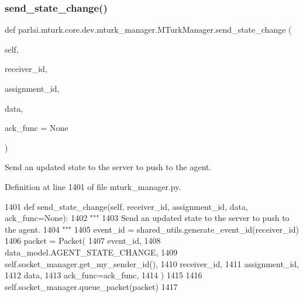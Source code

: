 \subsubsection{\texorpdfstring{send\+\_\+state\+\_\+change()}{send\_state\_change()}}
{\footnotesize\ttfamily def parlai.\+mturk.\+core.\+dev.\+mturk\+\_\+manager.\+M\+Turk\+Manager.\+send\+\_\+state\+\_\+change (\begin{DoxyParamCaption}\item[{}]{self,  }\item[{}]{receiver\+\_\+id,  }\item[{}]{assignment\+\_\+id,  }\item[{}]{data,  }\item[{}]{ack\+\_\+func = {\ttfamily None} }\end{DoxyParamCaption})}

\begin{DoxyVerb}Send an updated state to the server to push to the agent.
\end{DoxyVerb}
 

Definition at line 1401 of file mturk\+\_\+manager.\+py.


\begin{DoxyCode}
1401     \textcolor{keyword}{def }send\_state\_change(self, receiver\_id, assignment\_id, data, ack\_func=None):
1402         \textcolor{stringliteral}{"""}
1403 \textcolor{stringliteral}{        Send an updated state to the server to push to the agent.}
1404 \textcolor{stringliteral}{        """}
1405         event\_id = shared\_utils.generate\_event\_id(receiver\_id)
1406         packet = Packet(
1407             event\_id,
1408             data\_model.AGENT\_STATE\_CHANGE,
1409             self.socket\_manager.get\_my\_sender\_id(),
1410             receiver\_id,
1411             assignment\_id,
1412             data,
1413             ack\_func=ack\_func,
1414         )
1415 
1416         self.socket\_manager.queue\_packet(packet)
1417 
\end{DoxyCode}
\mbox{\label{classparlai_1_1mturk_1_1core_1_1dev_1_1mturk__manager_1_1MTurkManager_a004652cf2f04d80b22f793989805b4a5}} 
